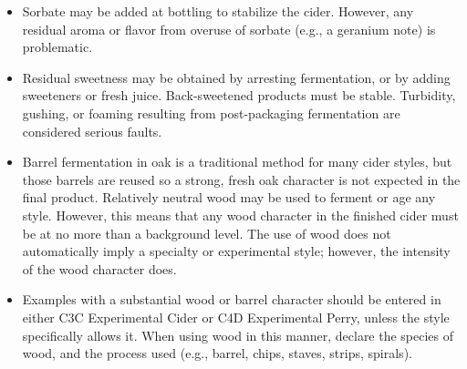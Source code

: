 \begin{itemize}
\item Sorbate may be added at bottling to stabilize the cider. However, any residual aroma or flavor from overuse of sorbate (e.g., a geranium note) is problematic.
\item Residual sweetness may be obtained by arresting fermentation, or by adding sweeteners or fresh juice. Back-sweetened products must be stable. Turbidity, gushing, or foaming resulting from post-packaging fermentation are considered serious faults.
\item Barrel fermentation in oak is a traditional method for many cider styles, but those barrels are reused so a strong, fresh oak character is not expected in the final product. Relatively neutral wood may be used to ferment or age any style. However, this means that any wood character in the finished cider must be at no more than a background level. The use of wood does not automatically imply a specialty or experimental style; however, the intensity of the wood character does.
\item Examples with a substantial wood or barrel character should be entered in either C3C Experimental Cider or C4D Experimental Perry, unless the style specifically allows it. When using wood in this manner, declare the species of wood, and the process used (e.g., barrel, chips, staves, strips, spirals).
\end{itemize}